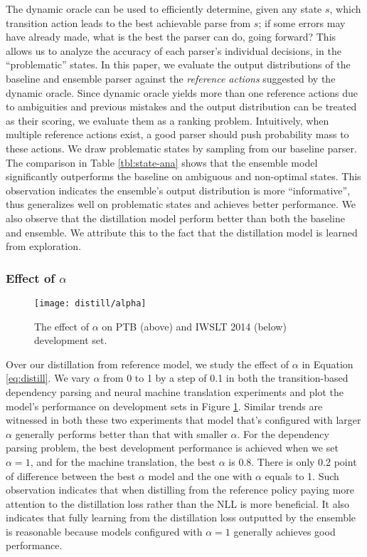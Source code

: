 The dynamic oracle  \cite{goldberg-nivre:2012:PAPERS,TACL302} 
can be used to efficiently determine, given any state $s$, which
transition action leads to the best achievable parse from $s$; 
if some errors may have already made, what is the best the parser can do,
going forward?  This allows us to analyze the accuracy of each
parser's individual decisions, in the ``problematic'' states.
In this paper, we evaluate the output distributions of the
baseline and ensemble parser against
the {\it reference actions} suggested by the dynamic oracle.
Since dynamic oracle yields more than one reference actions
due to ambiguities and previous mistakes and the output distribution
can be treated as their scoring, we evaluate them
as a ranking problem. Intuitively, when multiple reference actions exist,
a good parser should push probability mass to these actions.
We draw problematic states by sampling from our baseline parser.
The comparison in Table \ref{tbl:state-ana} shows
that the ensemble model significantly outperforms the baseline on ambiguous
and non-optimal states.
This observation indicates the ensemble's output distribution is more
``informative'', thus generalizes well on problematic states and achieves
better performance.
We also observe that the distillation model perform better than both the baseline and ensemble.
We attribute this to the fact that the distillation model is learned from exploration.
\subsubsection{Effect of $\alpha$}
\begin{figure}[t]
	\centering
	\texttt{[image: distill/alpha]}
	\caption{The effect of $\alpha$ on PTB (above)
		and IWSLT 2014 (below) development set.
	}\label{fig:alpha}
\end{figure}

Over our distillation from reference model, we study the effect of $\alpha$ in Equation \ref{eq:distill}.
We vary $\alpha$ from 0 to 1 by a step of 0.1 in both the transition-based dependency parsing
and neural machine translation experiments
and plot the model's performance on development sets in Figure \ref{fig:alpha}.
Similar trends are witnessed in both these two experiments that
model that's configured with larger $\alpha$ generally performs better than that with
smaller $\alpha$.
For the dependency parsing problem, the best development performance is achieved
when we set $\alpha=1$, and for the machine translation, the best $\alpha$ is 0.8.
There is only 0.2 point of difference between the best $\alpha$ model
and the one with $\alpha$ equals to 1.
Such observation indicates that
when distilling from the reference policy paying more attention
to the distillation loss rather than the NLL is more beneficial.
It also indicates that fully learning from 
the distillation loss outputted by the ensemble is reasonable because models configured with
$\alpha=1$ generally achieves good performance.

